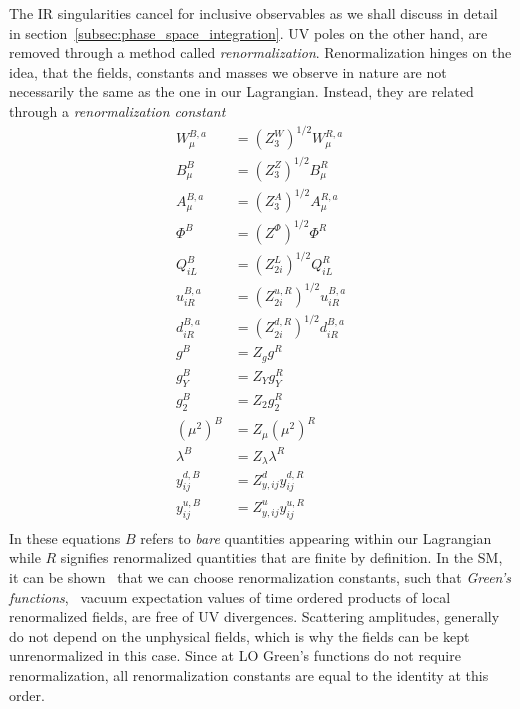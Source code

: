 The \acs{IR} singularities cancel for inclusive observables as we shall discuss in detail in section~\ref{subsec:phase_space_integration}. \acs{UV} poles on the other hand, are removed through a method called \textit{renormalization}. Renormalization hinges on the idea, that the fields, constants and masses we observe in nature are not necessarily the same as the one in our Lagrangian. Instead, they are related through a \textit{renormalization constant}
\begin{equation}
\begin{split}
W_\mu^{B,a} &= \left(Z_3^W \right)^{1/2} W_\mu^{R,a} \\
B_\mu^{B} &= \left(Z_3^Z \right)^{1/2} B_\mu^{R} \\
A_\mu^{B,a} &= \left(Z_3^A \right)^{1/2} A_\mu^{R,a} \\
\Phi^{B} &= \left(Z^\Phi \right)^{1/2} \Phi^{R} \\
Q_{iL}^{B} &= \left(Z_{2i}^L \right)^{1/2} Q_{iL}^{R} \\
u_{iR}^{B,a} &= \left(Z_{2i}^{u,R} \right)^{1/2} u_{iR}^{B,a} \\
d_{iR}^{B,a} &= \left(Z_{2i}^{d,R} \right)^{1/2} d_{iR}^{B,a} \\
g^B &= Z_g g^R \\
g_Y^B &= Z_Y g_Y^R \\
g_2^B &= Z_2 g_2^R \\
\left(\mu^2 \right)^B &= Z_\mu \left( \mu^2 \right)^R \\
\lambda^B &= Z_\lambda \lambda^R \\
y_{ij}^{d,B} &= Z_{y,ij}^{d} y_{ij}^{d,R} \\
y_{ij}^{u,B} &= Z_{y,ij}^{u} y_{ij}^{u,R} \\
\end{split}
\end{equation}
In these equations $B$ refers to \textit{bare} quantities appearing within our Lagrangian while $R$ signifies renormalized quantities that are finite by definition. In the \acs{SM}, it can be shown~\cite{tHooft:1971qjg,tHooft:1972tcz} that we can choose renormalization constants, such that \textit{Green's functions}, \ie\ vacuum expectation values of time ordered products of local renormalized fields, are free of \acs{UV} divergences. Scattering amplitudes, generally do not depend on the unphysical fields, which is why the fields can be kept unrenormalized in this case. Since at \acs{LO} Green's functions do not require renormalization, all renormalization constants are equal to the identity at this order.

